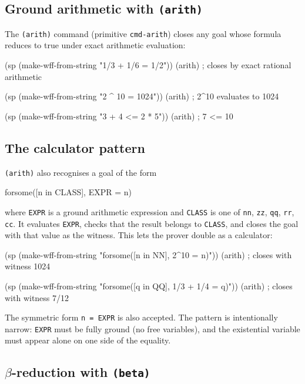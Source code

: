 \subsection{Ground arithmetic with \texttt{(arith)}}

The \texttt{(arith)} command (primitive \texttt{cmd-arith}) closes any
goal whose formula reduces to true under exact arithmetic evaluation:

\begin{VNBcode}
(sp (make-wff-from-string "1/3 + 1/6 = 1/2"))
(arith)                              ; closes by exact rational arithmetic

(sp (make-wff-from-string "2 ^ 10 = 1024"))
(arith)                              ; 2^10 evaluates to 1024

(sp (make-wff-from-string "3 + 4 <= 2 * 5"))
(arith)                              ; 7 <= 10
\end{VNBcode}

\subsection{The calculator pattern}

\texttt{(arith)} also recognises a goal of the form
\begin{VNBsnip}
forsome([n in CLASS], EXPR = n)
\end{VNBsnip}
where \texttt{EXPR} is a ground arithmetic expression and \texttt{CLASS}
is one of \texttt{nn}, \texttt{zz}, \texttt{qq}, \texttt{rr},
\texttt{cc}.  It evaluates \texttt{EXPR}, checks that the result belongs
to \texttt{CLASS}, and closes the goal with that value as the witness.
This lets the prover double as a calculator:

\begin{VNBcode}
(sp (make-wff-from-string "forsome([n in NN], 2^10 = n)"))
(arith)   ; closes with witness 1024

(sp (make-wff-from-string "forsome([q in QQ], 1/3 + 1/4 = q)"))
(arith)   ; closes with witness 7/12
\end{VNBcode}

\begin{remark}
The symmetric form \texttt{n = EXPR} is also accepted.
The pattern is intentionally narrow: \texttt{EXPR} must be fully ground
(no free variables), and the existential variable must appear alone on
one side of the equality.
\end{remark}

\subsection{\texorpdfstring{$\beta$}{beta}-reduction with \texttt{(beta)}}

